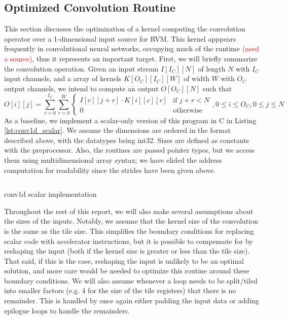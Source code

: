 \documentclass[acmsmall, nonacm=true]{acmart}
\begin{document}
\subsection{Optimized Convolution Routine}

This section discusses the optimization of a kernel computing the convolution operator over a 1-dimensional input source for RVM. This kernel apppears frequently in convolutional neural networks, occupying much of the runtime \textcolor{red}{(need a source)}, thus it represents an important target. First, we will briefly summarize the convolution operation. Given an input stream $I[I_C][N]$ of length $N$ with $I_C$ input channels, and a array of kernels $K[O_C][I_C][W]$ of width $W$ with $O_C$ output channels, we intend to compute an output $O[O_C][N]$ such that
$$ O[i][j] = \sum_{c = 0}^{I_C} \sum_{r = 0}^{W} \begin{cases} I[c][j+r] \cdot K[i][c][r] & \text{if } j+r<N \\ 0 & \text{otherwise} \end{cases}, 0 \leq i \leq O_C, 0 \leq j \leq N $$
As a baseline, we implement a scalar-only version of this program in C in Listing \ref{lst:conv1d_scalar}. We assume the dimensions are ordered in the format described above, with the datatypes being int32. Sizes are defined as constants with the preprocessor. Also, the routines are passed pointer types, but we access them using multidimensional array syntax; we have elided the address computation for readability since the strides have been given above.

\begin{listing}
    \centering
    \begin{verbatim}

\end{verbatim}
    \caption{conv1d scalar implementation}
    \label{lst:conv1d_scalar}
\end{listing}

Throughout the rest of this report, we will also make several assumptions about the sizes of the inputs. Notably, we assume that the kernel size of the convolution is the same as the tile size. This simplifies the boundary conditions for replacing scalar code with accelerator instructions, but it is possible to compensate for by reshaping the input (both if the kernel size is greater or less than the tile size). That said, if this is the case, reshaping the input is unlikely to be an optimal solution, and more care would be needed to optimize this routine around these boundary conditions. We will also assume whenever a loop needs to be split/tiled into smaller factors (e.g. 4 for the size of the tile registers) that there is no remainder. This is handled by once again either padding the input data or adding epilogue loops to handle the remainders.
\end{document}
